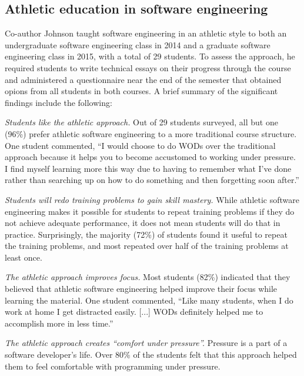 \subsection{Athletic education in software engineering}

Co-author Johnson taught software engineering in an athletic style to both an undergraduate software engineering class in 2014 and a graduate software engineering class in 2015, with a total of 29 students. To assess the approach, he required students to write technical essays on their progress through the course and administered a questionnaire near the end of the semester that obtained opions from all students in both courses. A brief summary of the significant findings include the following:

{\em Students like the athletic approach.} Out of 29 students surveyed, all but one (96\%) prefer athletic software engineering to a more traditional course structure.  One student commented, ``I would choose to do WODs over the traditional approach because it helps you to become accustomed to working under pressure. I find myself learning more this way due to having to remember what I've done rather than searching up on how to do something and then forgetting soon after.''

{\em Students will redo training problems to gain skill mastery.}  While athletic software engineering makes it possible for students to repeat training problems if they do not achieve adequate performance, it does not mean students will do that in practice. %
Surprisingly, the majority (72\%) of students found it useful to repeat the training problems, and most repeated over half of the training problems at least once. 

{\em The athletic approach improves focus.}  Most students (82\%) indicated that they believed that athletic software engineering helped improve their focus while learning the material.  One student commented, ``Like many students, when I do work at home I get distracted easily. [...] WODs definitely helped me to accomplish more in less time.''

{\em The athletic approach creates ``comfort under pressure''.}  Pressure is a part of a software developer's life.  Over 80\% of the students felt that this approach helped them to feel comfortable with programming under pressure.  %

